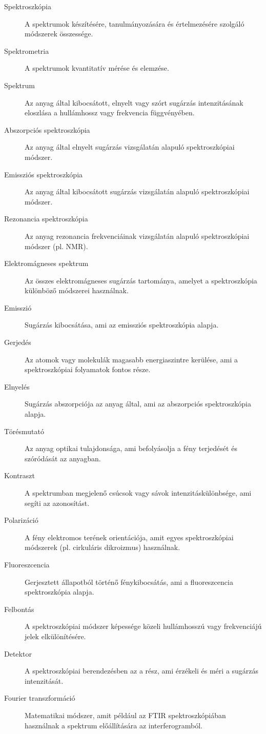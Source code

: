 \documentclass[a4paper,12pt]{article}
\begin{document}
\begin{description} \item[Spektroszkópia] A spektrumok készítésére, tanulmányozására és értelmezésére szolgáló módszerek összessége.

\item[Spektrometria] A spektrumok kvantitatív mérése és elemzése. \item[Spektrum] Az anyag által kibocsátott, elnyelt vagy szórt sugárzás intenzitásának eloszlása a hullámhossz vagy frekvencia függvényében. \item[Abszorpciós spektroszkópia] Az anyag által elnyelt sugárzás vizsgálatán alapuló spektroszkópiai módszer. \item[Emissziós spektroszkópia] Az anyag által kibocsátott sugárzás vizsgálatán alapuló spektroszkópiai módszer. \item[Rezonancia spektroszkópia] Az anyag rezonancia frekvenciáinak vizsgálatán alapuló spektroszkópiai módszer (pl. NMR). \item[Elektromágneses spektrum] Az összes elektromágneses sugárzás tartománya, amelyet a spektroszkópia különböző módszerei használnak. \item[Emisszió] Sugárzás kibocsátása, ami az emissziós spektroszkópia alapja. \item[Gerjedés] Az atomok vagy molekulák magasabb energiaszintre kerülése, ami a spektroszkópiai folyamatok fontos része. \item[Elnyelés] Sugárzás abszorpciója az anyag által, ami az abszorpciós spektroszkópia alapja. \item[Törésmutató] Az anyag optikai tulajdonsága, ami befolyásolja a fény terjedését és szóródását az anyagban. \item[Kontraszt] A spektrumban megjelenő csúcsok vagy sávok intenzitáskülönbsége, ami segíti az azonosítást. \item[Polarizáció] A fény elektromos terének orientációja, amit egyes spektroszkópiai módszerek (pl. cirkuláris dikroizmus) használnak. \item[Fluoreszcencia] Gerjesztett állapotból történő fénykibocsátás, ami a fluoreszcencia spektroszkópia alapja. \item[Felbontás] A spektroszkópiai módszer képessége közeli hullámhosszú vagy frekvenciájú jelek elkülönítésére. \item[Detektor] A spektroszkópiai berendezésben az a rész, ami érzékeli és méri a sugárzás intenzitását. \item[Fourier transzformáció] Matematikai módszer, amit például az FTIR spektroszkópiában használnak a spektrum előállítására az interferogramból.
\end{description}
\end{document}
